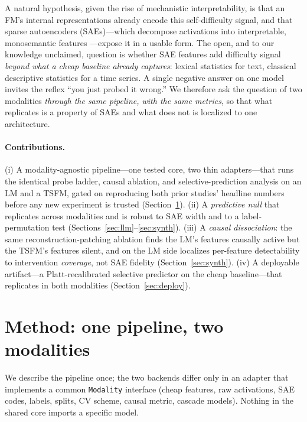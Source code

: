 \documentclass[11pt]{article}
\newcommand{\sae}{SAE}
\begin{document}
A natural hypothesis, given the rise of mechanistic interpretability, is that an
FM's internal representations already encode this self-difficulty signal, and
that sparse autoencoders (\sae{}s)---which decompose activations into
interpretable, monosemantic features \citep{bricken2023monosemanticity,gao2024scaling}---expose
it in a usable form. The open, and to our knowledge unclaimed, question is
whether \sae{} features add difficulty signal \emph{beyond what a cheap baseline
already captures}: lexical statistics for text, classical descriptive statistics
for a time series. A single negative answer on one model invites the reflex
``you just probed it wrong.'' We therefore ask the question of two modalities
\emph{through the same pipeline, with the same metrics}, so that what replicates
is a property of \sae{}s and what does not is localized to one architecture.

\paragraph{Contributions.}
(i) A modality-agnostic pipeline---one tested core, two thin adapters---that runs
the identical probe ladder, causal ablation, and selective-prediction analysis on
an LM and a TSFM, gated on reproducing both prior studies' headline numbers
before any new experiment is trusted (Section~\ref{sec:method}).
(ii) A \emph{predictive null} that replicates across modalities and is robust to
\sae{} width and to a label-permutation test (Sections~\ref{sec:llm}--\ref{sec:synth}).
(iii) A \emph{causal dissociation}: the same reconstruction-patching ablation
finds the LM's features causally active but the TSFM's features silent, and on
the LM side localizes per-feature detectability to intervention \emph{coverage},
not \sae{} fidelity (Section~\ref{sec:synth}).
(iv) A deployable artifact---a Platt-recalibrated selective predictor on the cheap
baseline---that replicates in both modalities (Section~\ref{sec:deploy}).

\section{Method: one pipeline, two modalities}
\label{sec:method}

We describe the pipeline once; the two backends differ only in an adapter that
implements a common \texttt{Modality} interface (cheap features, raw activations,
\sae{} codes, labels, splits, CV scheme, causal metric, cascade models). Nothing
in the shared core imports a specific model.
\end{document}
